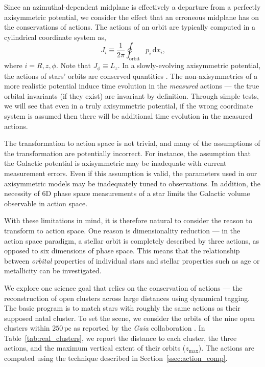 \documentclass[twocolumn]{aastex62}
\newcommand{\pc}{\text{pc}}
\newcommand{\beq}{\begin{equation}}
\newcommand{\eeq}{\end{equation}}
\begin{document}
Since an azimuthal-dependent midplane is effectively a departure from a
perfectly axisymmetric potential, we consider the effect that an erroneous
midplane has on the conservations of actions. The actions of an orbit are
typically computed in a cylindrical coordinate system as,
\beq\label{eq:actions}
J_i \equiv
\frac{1}{2\pi} \oint_{\text{orbit}}p_i\,\text{d}x_i\text{,}
\eeq
where $i=R,z,\phi$. Note that $J_{\phi} \equiv L_z$. In a slowly-evolving
axisymmetric potential, the actions of stars' orbits are conserved quantities
\citep{2008gady.book.....B,2014RvMP...86....1S}. The non-axisymmetries of a
more realistic potential induce time evolution in the {\em measured} actions
--- the true orbital invariants (if they exist) are invariant by definition.
Through simple tests, we will see that even in a truly axisymmetric potential,
if the wrong coordinate system is assumed then there will be additional time
evolution in the measured actions.

The transformation to action space is not trivial, and many of the assumptions
of the transformation are potentially incorrect. For instance, the assumption
that the Galactic potential is axisymmetric may be inadequate with current
measurement errors. Even if this assumption is valid, the parameters used in
our axisymmetric models may be inadequately tuned to observations. In
addition, the necessity of 6D phase space measurements of a star limits the
Galactic volume observable in action space.

With these limitations in mind, it is therefore natural to consider the reason
to transform to action space. One reason is dimensionality reduction --- in
the action space paradigm, a stellar orbit is completely described by three
actions, as opposed to six dimensions of phase space. This means that the
relationship between {\em orbital} properties of individual stars and stellar
properties such as age or metallicity can be investigated.

We explore one science goal that relies on the conservation of actions --- the
reconstruction of open clusters across large distances using dynamical
tagging. The basic program is to match stars with roughly the same actions as
their supposed natal cluster. To set the scene, we consider the orbits of the
nine open clusters within $250\,\pc$ as reported by the {\em Gaia}
collaboration \citep{2018A&A...616A..10G}. In Table~\ref{tab:real_clusters},
we report the distance to each cluster, the three actions, and the maximum
vertical extent of their orbits ($z_{\text{max}}$). The actions are computed
using the technique described in Section~\ref{ssec:action_comp}.
\end{document}
